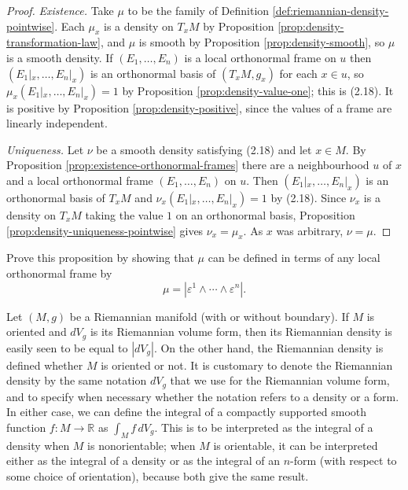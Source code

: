 \begin{proof}
\leanok
{}
\emph{Existence.} Take $\mu$ to be the family of Definition \ref{def:riemannian-density-pointwise}.
Each $\mu_x$ is a density on $T_x M$ by Proposition \ref{prop:density-transformation-law}, and
$\mu$ is smooth by Proposition \ref{prop:density-smooth}, so $\mu$ is a smooth density. If
$(E_1, \ldots, E_n)$ is a local orthonormal frame on $u$ then $(E_1|_x, \ldots, E_n|_x)$ is an
orthonormal basis of $(T_x M, g_x)$ for each $x \in u$, so $\mu_x(E_1|_x, \ldots, E_n|_x) = 1$ by
Proposition \ref{prop:density-value-one}; this is (2.18). It is positive by Proposition
\ref{prop:density-positive}, since the values of a frame are linearly independent.

\emph{Uniqueness.} Let $\nu$ be a smooth density satisfying (2.18) and let $x \in M$. By
Proposition \ref{prop:existence-orthonormal-frames} there are a neighbourhood $u$ of $x$ and a
local orthonormal frame $(E_1, \ldots, E_n)$ on $u$. Then $(E_1|_x, \ldots, E_n|_x)$ is an
orthonormal basis of $T_x M$ and $\nu_x(E_1|_x, \ldots, E_n|_x) = 1$ by (2.18). Since $\nu_x$ is a
density on $T_x M$ taking the value $1$ on an orthonormal basis, Proposition
\ref{prop:density-uniqueness-pointwise} gives $\nu_x = \mu_x$. As $x$ was arbitrary, $\nu = \mu$.
\end{proof}

\begin{exercise}\label{exer:riemannian-density-formula}
Prove this proposition by showing that $\mu$ can be defined in terms of any local orthonormal frame by
\[
\mu = |\varepsilon^1 \wedge \cdots \wedge \varepsilon^n|.
\]
\end{exercise}

Let $(M,g)$ be a Riemannian manifold (with or without boundary). If $M$ is oriented and $dV_g$ is its Riemannian volume form, then its Riemannian density is easily seen to be equal to $|dV_g|$. On the other hand, the Riemannian density is defined whether $M$ is oriented or not. It is customary to denote the Riemannian density by the same notation $dV_g$ that we use for the Riemannian volume form, and to specify when necessary whether the notation refers to a density or a form. In either case, we can define the integral of a compactly supported smooth function $f: M \to \mathbb{R}$ as $\int_M f\, dV_g$. This is to be interpreted as the integral of a density when $M$ is nonorientable; when $M$ is orientable, it can be interpreted either as the integral of a density
or as the integral of an $n$-form (with respect to some choice of orientation), because
both give the same result.

